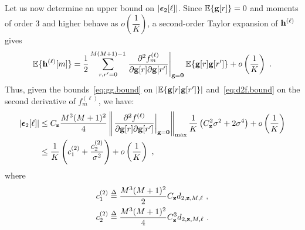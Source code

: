 \documentclass[journal,onecolumn]{IEEEtran}
\begin{document}
Let us now determine an upper bound on $\left|\boldsymbol{\epsilon}_2[\ell]\right|$. Since ${\mathbb E}\{{\mathbf g}[r]\}=0$ and moments of order $3$ and higher behave as $o\left(\dfrac1K\right)$, a second-order Taylor expansion of ${\mathbf h}^{(\ell)}$ gives
\begin{equation}
\EE\{\bh^{(\ell)}[m]\} = \dfrac12\sum_{r,r'=0}^{M(M+1)-1}\left.\dfrac{\partial^2 f_m^{(\ell)}}{\partial \bg[r]\partial \bg[r']}\right\vert_{\bg=\bzero} \EE\{\bg[r]\bg[r']\} + o\left(\dfrac1K\right)\ .
\label{eq:Eh}
\end{equation}
Thus, given the bounds~\eqref{eq:gg.bound} on $\left|{\mathbb E}\{{\mathbf g}[r]{\mathbf g}[r']\}\right|$ and~\eqref{eq:d2f.bound} on the second derivative of $f_m^{(\ell)}$, we have:
\begin{align}
\nonumber
\left|\bepsilon_2[\ell]\right| &\leq C_\bz\dfrac{M^3(M+1)^2}{4}\left\|\left.\dfrac{\partial^2 f^{(\ell)}}{\partial \bg[r]\partial \bg[r']}\right\vert_{\bg=\bzero}\right\|_{\max} \dfrac1K \left( C_\bz^2\sigma^2 + 2 \sigma^4\right) + o\left(\dfrac1K\right)  \\
&\leq \dfrac1K \left(c^{(2)}_1 + \dfrac{c^{(2)}_2}{\sigma^2} \right) + o\left(\dfrac1K\right)\ ,
\label{eq:eps2}
\end{align}
where
\begin{align*}
c^{(2)}_1 &\overset{\Delta}{=}\dfrac{M^3(M+1)^2}{2}C_{\mathbf z} d_{2,{\mathbf z},M,\ell}\ ,\\
c^{(2)}_2 &\overset{\Delta}{=}\dfrac{M^3(M+1)^2}{4}C_{\mathbf z}^3 d_{2,{\mathbf z},M,\ell} \ .
\end{align*}
\end{document}
